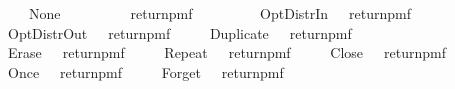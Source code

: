 \ \ \ \ \ \ {\isacharbar}\ None\ {\isasymRightarrow}\ \ \ {\isasymbind}\ {\isacharparenleft}{\isasymlambda}\ \ \ {\isasymbind}\ {\isacharparenleft}{\isasymlambda}\ return{\isacharunderscore}pmf\ {\isacharparenleft}\ {\isacharplus}\ \ {\isacharslash}\ {}{\isacharparenright}{\isacharparenright}{\isacharparenright}{\isacharparenright}{\isachardoublequoteclose}\isanewline
\ \ {\isacharbar}\ {\isachardoublequoteopen}\ {\isacharparenleft}OptDistrIn\ \ {\isacharequal}\ return{\isacharunderscore}pmf\ {}{\isachardoublequoteclose}\isanewline
\ \ {\isacharbar}\ {\isachardoublequoteopen}\ {\isacharparenleft}OptDistrOut\ \ {\isacharequal}\ return{\isacharunderscore}pmf\ {}{\isachardoublequoteclose}\isanewline
\ \ {\isacharbar}\ {\isachardoublequoteopen}\ {\isacharparenleft}Duplicate\ \ {\isacharequal}\ return{\isacharunderscore}pmf\ {}{\isachardoublequoteclose}\isanewline
\ \ {\isacharbar}\ {\isachardoublequoteopen}\ {\isacharparenleft}Erase\ \ {\isacharequal}\ return{\isacharunderscore}pmf\ {}{\isachardoublequoteclose}\isanewline
\ \ {\isacharbar}\ {\isachardoublequoteopen}\ {\isacharparenleft}Repeat\ \ {\isacharequal}\ return{\isacharunderscore}pmf\ {}{\isachardoublequoteclose}\isanewline
\ \ {\isacharbar}\ {\isachardoublequoteopen}\ {\isacharparenleft}Close\ \ {\isacharequal}\ return{\isacharunderscore}pmf\ {}{\isachardoublequoteclose}\isanewline
\ \ {\isacharbar}\ {\isachardoublequoteopen}\ {\isacharparenleft}Once\ \ {\isacharequal}\ return{\isacharunderscore}pmf\ {}{\isachardoublequoteclose}\isanewline
\ \ {\isacharbar}\ {\isachardoublequoteopen}\ {\isacharparenleft}Forget\ \ {\isacharequal}\ return{\isacharunderscore}pmf\ {}{\isachardoublequoteclose}
